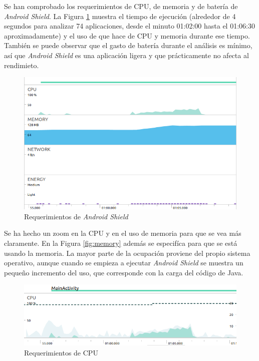 Se han comprobado los requerimientos de CPU, de memoria y de batería de \textit{Android Shield}. La Figura \ref{fig:general} muestra el tiempo de ejecución (alrededor de 4 segundos para analizar 74 aplicaciones, desde el minuto 01:02:00 hasta el 01:06:30 aproximadamente) y el uso de que hace de CPU y memoria durante ese tiempo. También se puede observar que el gasto de batería durante el análisis es mínimo, así que \textit{Android Shield} es una aplicación ligera y que prácticamente no afecta al rendimieto.

\begin{figure}[H]
\centering
	\includegraphics[scale=0.5]{img/general.png}
	\caption{Requerimientos de \textit{Android Shield}}
	\label{fig:general}
\end{figure}

Se ha hecho un zoom en la CPU y en el uso de memoria para que se vea más claramente. En la Figura \ref{fig:memory} además se especifíca para que se está usando la memoria. La mayor parte de la ocupación proviene del propio sistema operativo, aunque cuando se empieza a ejecutar \textit{Android Shield} se muestra un pequeño incremento del uso, que corresponde con la carga del código de Java.

\begin{figure}[H]
\centering
	\includegraphics[scale=0.5]{img/cpu.png}
	\caption{Requerimientos de CPU}
	\label{fig:cpu}
\end{figure}

